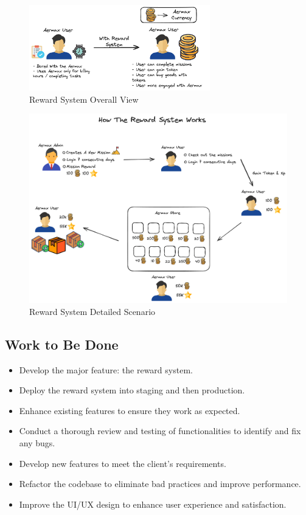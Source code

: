 \begin{figure}[H]
    \centering
    \includegraphics[width=0.7\textwidth]{src/assets/diagrams/rewardexplain.png}
    \caption{Reward System Overall View}
    \label{fig:Reward_System_explain_image}
\end{figure}

\begin{figure}[H]
    \centering
    \includegraphics[width=1\textwidth]{src/assets/diagrams/rewardexplain2.png}
    \caption{Reward System Detailed Scenario}
    \label{fig:Reward_System_detailed_explain_image}
\end{figure}
   

\subsection{Work to Be Done}
\begin{itemize}
    \item Develop the major feature: the reward system.
    \item  Deploy the reward system into staging and then production.
    \item Enhance existing features to ensure they work as expected.
    \item Conduct a thorough review and testing of functionalities to identify and fix any bugs.
    \item Develop new features to meet the client's requirements.
    \item Refactor the codebase to eliminate bad practices and improve performance.
    \item Improve the UI/UX design to enhance user experience and satisfaction.
\end{itemize}

